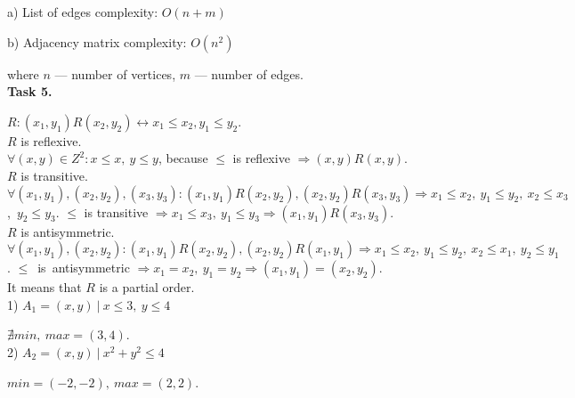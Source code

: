 \documentclass{article}
\begin{document}
a) List of edges complexity: $O(n+m)$

b) Adjacency matrix complexity: $O(n^2)$

where $n$ --- number of vertices, $m$ --- number of edges.\\

\textbf{Task 5.}

$R: (x_1, y_1) R (x_2, y_2) \leftrightarrow x_1 \leq x_2, y_1 \leq y_2$.\\

$R$ is reflexive.\\
$\forall (x,y) \in Z^2: x \leq x,~y \leq y$, because $\leq$ is reflexive $\Rightarrow (x,y) R (x,y)$.\\

$R$ is transitive.\\
$\forall (x_1,y_1), (x_2,y_2), (x_3,y_3): (x_1,y_1) R (x_2,y_2), (x_2,y_2) R (x_3,y_3) \Rightarrow x_1 \leq x_2,~y_1 \leq y_2,~x_2 \leq x_3$,\ $y_2 \leq y_3$. $\leq$ is transitive $\Rightarrow x_1 \leq x_3,~y_1 \leq y_3 \Rightarrow (x_1,y_1) R (x_3,y_3)$.\\

$R$ is antisymmetric.\\
$\forall (x_1,y_1), (x_2,y_2): (x_1,y_1) R (x_2,y_2), (x_2,y_2) R (x_1,y_1) \Rightarrow x_1 \leq x_2,~y_1 \leq y_2,~x_2 \leq x_1,~y_2 \leq y_1$. $\leq$~is~antisymmetric $\Rightarrow x_1 = x_2,~y_1 = y_2 \Rightarrow (x_1,y_1) = (x_2,y_2)$.\\

It means that $R$ is a partial order.\\

1) $A_1 = {(x,y)~|~x \leq 3,~y \leq 4}$

$\nexists min,~max = (3,4)$.\\

2) $A_2 = {(x,y)~|~x^2 + y^2 \leq 4}$

$min = (-2,-2),~max = (2,2)$.

 
\end{document}
